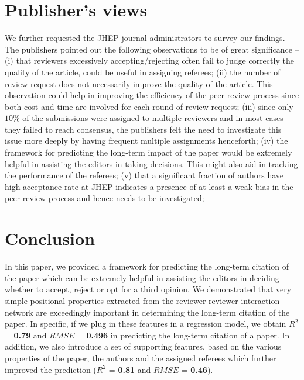 \section{Publisher's views}
\label{implication}
We further requested the JHEP journal administrators to survey our findings. The publishers pointed out the following observations to be of great significance -- 
(i) that reviewers excessively accepting/rejecting often fail to judge correctly the quality of the article, could be useful in assigning referees;
(ii) the number of review request does not necessarily improve the quality of the article. This observation could help in improving the efficiency of the peer-review process since both cost and time are involved for each round of review request; 
(iii) since only $10\%$ of the submissions were assigned to multiple reviewers and in most cases they failed to reach consensus, the publishers felt the need to investigate this issue more deeply by having frequent multiple assignments henceforth; 
(iv) the framework for predicting the long-term impact of the paper would be extremely helpful in assisting the editors in taking decisions. This might also aid in tracking the performance of the referees;
(v) that a significant fraction of authors have high acceptance rate at JHEP indicates a presence of at least a weak bias in the peer-review process and hence needs to be investigated;

%
%
\section{Conclusion}
\label{conclusion}

In this paper, we provided a framework for predicting the long-term citation of the paper which can be extremely helpful in assisting the editors in deciding whether to accept, reject or opt for a third opinion. We demonstrated that very simple positional properties extracted from the reviewer-reviewer interaction network are exceedingly important in determining the long-term citation of the paper. In specific, if we plug in these features in a regression model, we obtain $R^2$ = \textbf{0.79} and $RMSE$ = \textbf{0.496} in predicting the long-term citation of a paper. In addition, we also introduce a set of supporting features, based on the various properties of the paper, the authors and the assigned referees which further improved the prediction ($R^2$ = \textbf{0.81} and $RMSE$ = \textbf{0.46}). 

